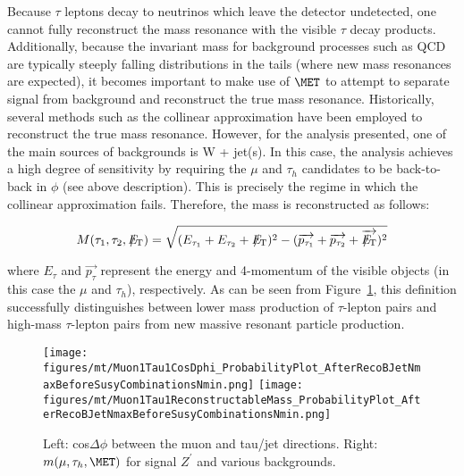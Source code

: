 Because $\tau$ leptons decay to neutrinos which leave the detector undetected, one cannot fully reconstruct the mass resonance with the visible $\tau$ decay 
products. Additionally, because the invariant mass for background processes such as QCD are typically steeply falling distributions in the tails (where new mass 
resonances are expected), it becomes important to make use of $\MET$ to attempt to separate signal from background and reconstruct the true mass 
resonance. Historically, several methods such as the collinear approximation have been employed to reconstruct the true mass resonance. However, for the analysis 
presented, one of the main sources of backgrounds is W + jet(s). In this case, the analysis achieves a high degree of sensitivity by requiring the 
$\mu$ and $\tau_{h}$ candidates to be back-to-back in $\phi$ (see above description). This is precisely the regime in 
which the collinear approximation fails. Therefore, the mass is reconstructed as follows:

\begin{equation}
   M(\tau_{1},\tau_{2},{E\!\!\!\!/_{\rm T}}) = \sqrt{(E_{\tau_{1}}+E_{\tau_{2}}+{E\!\!\!\!/_{\rm
T}})^{2}-(\overrightarrow{p_{\tau_{1}}}+\overrightarrow{p_{\tau_{2}}}+\overrightarrow{{E\!\!\!\!/_{\rm T}}})^{2}}
\label{eq:ditaumass}
\end{equation}

\noindent where $E_{\tau}$ and $\overrightarrow{p_{\tau}}$ represent the energy and 4-momentum of the visible objects (in this case the $\mu$ and $\tau_{h}$), respectively.  As can be seen from Figure~\ref{fig:MuTauMass}, this definition successfully distinguishes 
between lower mass production of $\tau$-lepton pairs and high-mass $\tau$-lepton pairs from new massive resonant particle production.

\begin{figure}\centering
  \texttt{[image: figures/mt/Muon1Tau1CosDphi\_ProbabilityPlot\_AfterRecoBJetNmaxBeforeSusyCombinationsNmin.png]}
  \texttt{[image: figures/mt/Muon1Tau1ReconstructableMass\_ProbabilityPlot\_AfterRecoBJetNmaxBeforeSusyCombinationsNmin.png]}
  \caption{\label{fig:MuTauMass} Left: cos$\Delta \phi$ between the muon and tau/jet directions.  Right: $m(\mu,\tau_{h},\MET)$ for signal $Z^{\prime}$ 
and various backgrounds.}
\end{figure}


